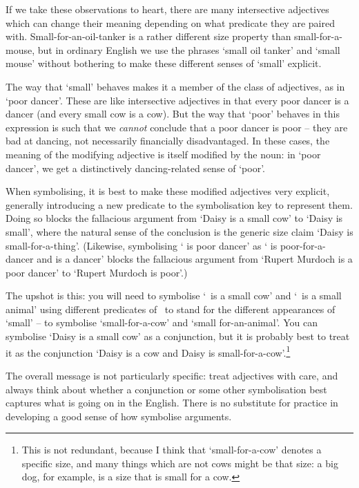 If we take these observations to heart, there are many intersective adjectives which can change their meaning depending on what predicate they are paired with. Small-for-an-oil-tanker is a rather different size property than small-for-a-mouse, but in ordinary English we use the phrases `small oil tanker' and `small mouse' without bothering to make these different senses of `small' explicit. 

The way that `small' behaves makes it a member of the class of  adjectives, as in `poor dancer'. These are like intersective adjectives in that every poor dancer is a dancer (and every small cow is a cow). But the way that `poor' behaves in this expression is such that we \emph{cannot} conclude that a poor dancer is poor – they are bad at dancing, not necessarily financially disadvantaged. In these cases, the meaning of the modifying adjective is itself modified by the noun: in `poor dancer', we get a distinctively dancing-related sense of `poor'.   

When symbolising, it is best to make these modified adjectives  very explicit, generally introducing a new predicate to the symbolisation key to represent them. Doing so blocks the fallacious argument from `Daisy is a small cow' to `Daisy is small', where the natural sense of the conclusion is the generic size claim `Daisy is small-for-a-thing'. (Likewise, symbolising `\gap{} is poor dancer' as `\gap{} is poor-for-a-dancer and \gap{} is a dancer' blocks the fallacious argument from `Rupert Murdoch is a poor dancer' to `Rupert Murdoch is poor'.)

The upshot is this: you will need to symbolise `\blank\ is a small cow' and `\blank\ is a small animal' using different predicates of \FOL\ to stand for the different appearances of `small' – to symbolise `small-for-a-cow' and `small for-an-animal'. You can symbolise `Daisy is a small cow' as a conjunction, but it is probably best to treat it as the conjunction `Daisy is a cow and Daisy is small-for-a-cow'.\footnote{This is not redundant, because I think that `small-for-a-cow' denotes a specific size, and many things which are not cows might be that size: a big dog, for example, is a size that is small for a cow.}

The overall message is not particularly specific: treat adjectives with care, and always think about whether a conjunction or some other symbolisation best captures what is going on in the English. There is no substitute for practice in developing a good sense of how symbolise arguments. 

